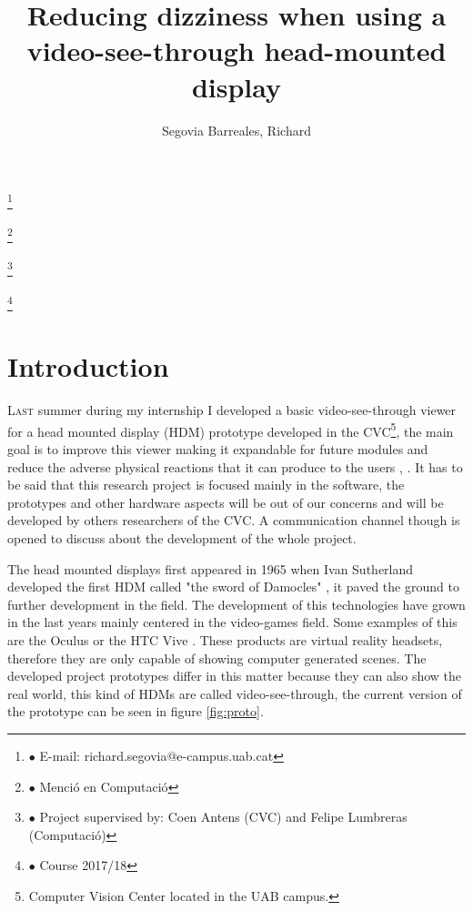 \documentclass[10pt,a4paper,twocolumn,twoside]{article}
\author{\LARGE\sffamily Segovia Barreales, Richard}
\title{\Huge{\sffamily Reducing dizziness when using a video-see-through head-mounted display}}
\date{}
\newcommand\blfootnote[1]{%
	\begingroup
	\renewcommand\thefootnote{}\footnote{#1}%
	\addtocounter{footnote}{-1}%
	\endgroup
}
\begin{document}
	
	\fancyhead[RO]{\thepage}
	\fancyhead[LE]{\thepage}
	
	\fancyfoot[CO,CE]{}
	
	{
		\fancyhf{}
	}
	
	\renewcommand{\headrulewidth}{0pt}
	\renewcommand{\footrulewidth}{0pt}
	\pagestyle{fancy}
	
	\maketitle
	
	\thispagestyle{primerapagina}
	
	
	\blfootnote{$\bullet$ E-mail: richard.segovia@e-campus.uab.cat}
	\blfootnote{$\bullet$ Menció en Computació}
	\blfootnote{$\bullet$ Project supervised by: Coen Antens (CVC) and Felipe Lumbreras (Computació)}
	\blfootnote{$\bullet$ Course 2017/18}
	
	\section{Introduction}
	
	\lettrine[lines=3]{L}{ast} summer during my internship I developed a basic video-see-through viewer for a head mounted display (HDM) prototype developed in the CVC\footnote{Computer Vision Center located in the UAB campus.}, the main goal is to improve this viewer making it expandable for future modules and reduce the adverse physical reactions that it can produce to the users \cite{disconfortReview}, \cite{unpublishCVC}. It has to be said that this research project is focused mainly in the software, the prototypes and other hardware aspects will be out of our concerns and will be developed by others researchers of the CVC. A communication channel though is opened to discuss about the development of the whole project.
	
	The head mounted displays first appeared in 1965 when Ivan Sutherland developed the first HDM called "the sword of Damocles" \cite{hdmSutherland}, it paved the ground to further development in the field. The development of this technologies have grown in the last years mainly centered in the video-games field. Some examples of this are the Oculus \cite{web:oculus} or the HTC Vive \cite{web:vive}. These products are virtual reality headsets, therefore they are only capable of showing computer generated scenes. The developed project prototypes differ in this matter because they can also show the real world, this kind of HDMs are called video-see-through, the current version of the prototype can be seen in figure \ref{fig:proto}.
	
\end{document}
